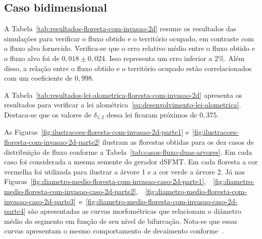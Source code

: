 \subsection{Caso bidimensional}\label{sec:floresta-com-invasao-caso-2d}

A Tabela~\ref{tab:resultados-floresta-com-invasao-2d} resume os resultados
das simulações para verificar o fluxo obtido e o território ocupado, em contraste com o 
fluxo alvo fornecido.
Verifica-se que o erro relativo médio entre o fluxo obtido e o fluxo alvo foi 
de $0,018 \pm 0,024$. Isso representa um erro inferior a $2\%$. 
Além disso, a relação entre o fluxo obtido e o território ocupado estão correlacionados com um
coeficiente de $0,998$. 

A Tabela~\ref{tab:resultados-lei-alometrica-floresta-com-invasao-2d} apresenta os resultados 
para verificar a lei alométrica~\eqref{eq:desenvolvimento-lei-alometrica}. Destaca-se que os valores
de $\delta_{1, 2}$ dessa lei ficaram próximos de $0,375$.

As Figuras~\ref{fig:ilustracoes-floresta-com-invasao-2d-parte1} e~\ref{fig:ilustracoes-floresta-com-invasao-2d-parte2} 
ilustram as florestas obtidas para os dez casos de distribuição de fluxo conforme 
a Tabela~\ref{tab:casos-fluxo-duas-arvores}. 
Em cada caso foi considerada a mesma semente do gerador dSFMT. 
Em cada floresta a cor vermelha foi utilizada 
para ilustrar a árvore 1 e a cor verde a árvore 2.
Já nas Figuras~\ref{fig:diametro-medio-floresta-com-invasao-caso-2d-parte1},\ 
~\ref{fig:diametro-medio-floresta-com-invasao-caso-2d-parte2},\ 
~\ref{fig:diametro-medio-floresta-com-invasao-caso-2d-parte3}\ 
e~\ref{fig:diametro-medio-floresta-com-invasao-caso-2d-parte4} são apresentadas 
as curvas morfométricas que relacionam o diâmetro médio 
do segmento em função de seu nível de bifurcação. Nota-se que essas curvas apresentam
o mesmo comportamento de decaimento conforme~\cite{Karch1999}.

\clearpage

